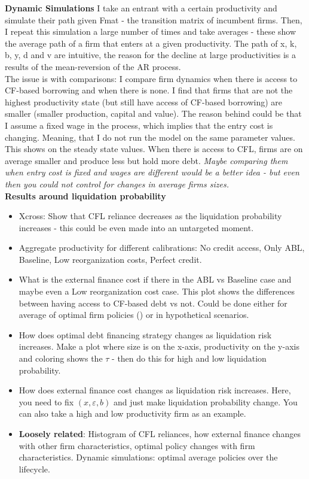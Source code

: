 \documentclass[12pt]{article}
\begin{document}
\textbf{Dynamic Simulations} 
I take an entrant with a certain productivity and simulate their path given Fmat - the transition matrix of incumbent firms. Then, I repeat this simulation a large number of times and take averages - these show the average path of a firm that enters at a given productivity. The path of x, k, b, y, d and v  are intuitive, the reason for the decline at large productivities is a results of the mean-reversion of the AR process. \vspace{3mm} \\
The issue is with comparisons: I compare firm dynamics when there is access to CF-based borrowing and when there is none. I find that firms that are not the highest productivity state (but still have access of CF-based borrowing) are smaller (smaller production, capital and value). The reason behind could be that I assume a fixed wage in the process, which implies that the entry cost is changing. Meaning, that I do not run the model on the same parameter values. This shows on the steady state values.  When there is access to CFL, firms are on average smaller and produce less but hold more debt. \textit{Maybe comparing them when entry cost is fixed and wages are different would be a better idea - but even then you could not control for changes in average firms sizes.} \vspace{3mm} \\
\textbf{Results around liquidation probability} \\ 
\begin{itemize}\setlength\itemsep{0em} \small
    \item Xcross: Show that CFL reliance decreases as the liquidation probability increases - this could be even made into an untargeted moment. \checkmark
    \item Aggregate productivity for different calibrations: No credit access, Only ABL, Baseline, Low reorganization costs, Perfect credit.  \checkmark
    \item What is the external finance cost if there in the ABL vs Baseline case and maybe even a Low reorganization cost case. This plot shows the differences between having access to CF-based debt vs not. Could be done either for average of optimal firm policies (\checkmark) or in hypothetical scenarios.
    \item How does optimal debt financing strategy changes as liquidation risk increases. Make a plot where size is on the x-axis, productivity on the y-axis and coloring shows the $\tau$ - then do this for high and low liquidation probability. 
    \item How does external finance cost changes as liquidation risk increases. Here, you need to fix $(x,\varepsilon,b)$ and just make liquidation probability change. You can also take a high and low productivity firm as an example. 
    \item \textbf{Loosely related}: Histogram of CFL reliances, how external finance changes with other firm characteristics, optimal policy changes with firm characteristics. Dynamic simulations: optimal average policies over the lifecycle. 
 \end{itemize} \normalsize
\end{document}
